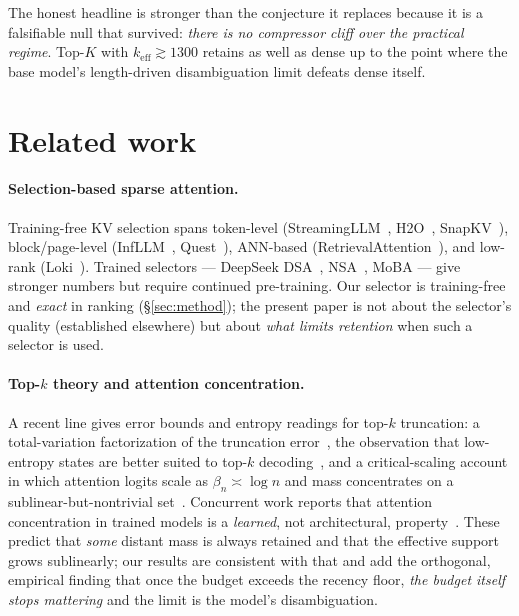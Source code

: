 \documentclass[11pt]{article}
\newcommand{\keff}{k_{\mathrm{eff}}}
\begin{document}
The honest headline is stronger than the conjecture it replaces because it is a
falsifiable null that survived: \emph{there is no compressor cliff over the
practical regime}. Top-$K$ with $\keff\gtrsim 1300$ retains as well as dense up to
the point where the base model's length-driven disambiguation limit defeats dense
itself.

\section{Related work}
\label{sec:related}

\paragraph{Selection-based sparse attention.}
Training-free KV selection spans token-level
(StreamingLLM~\cite{xiao2023streaming}, H2O~\cite{zhang2023h2o},
SnapKV~\cite{li2024snapkv}), block/page-level
(InfLLM~\cite{xiao2024infllm}, Quest~\cite{tang2024quest}), ANN-based
(RetrievalAttention~\cite{liu2024retrieval}), and low-rank
(Loki~\cite{singhania2024loki}). Trained selectors --- DeepSeek
DSA~\cite{deepseek2025v32}, NSA~\cite{yuan2025nsa}, MoBA --- give stronger numbers
but require continued pre-training. Our selector is training-free and \emph{exact}
in ranking (\S\ref{sec:method}); the present paper is not about the selector's
quality (established elsewhere) but about \emph{what limits retention} when such a
selector is used.

\paragraph{Top-$k$ theory and attention concentration.}
A recent line gives error bounds and entropy readings for top-$k$ truncation:
a total-variation factorization of the truncation
error~\cite{tvtopk2025}, the observation that low-entropy states are better suited
to top-$k$ decoding~\cite{nativetopk2025}, and a critical-scaling account in which
attention logits scale as $\beta_n\asymp\log n$ and mass concentrates on a
sublinear-but-nontrivial set~\cite{criticalscaling2025}. Concurrent work reports
that attention concentration in trained models is a \emph{learned}, not
architectural, property~\cite{condensate2026}. These predict that \emph{some}
distant mass is always retained and that the effective support grows sublinearly;
our results are consistent with that and add the orthogonal, empirical finding that
once the budget exceeds the recency floor, \emph{the budget itself stops mattering}
and the limit is the model's disambiguation.
\end{document}
